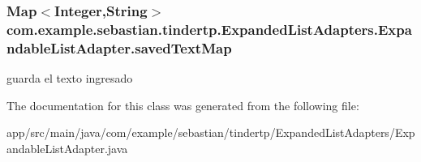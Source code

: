 \subsubsection[{\texorpdfstring{saved\+Text\+Map}{savedTextMap}}]{\setlength{\rightskip}{0pt plus 5cm}Map$<$Integer,String$>$ com.\+example.\+sebastian.\+tindertp.\+Expanded\+List\+Adapters.\+Expandable\+List\+Adapter.\+saved\+Text\+Map\hspace{0.3cm}{\ttfamily [private]}}\hypertarget{classcom_1_1example_1_1sebastian_1_1tindertp_1_1ExpandedListAdapters_1_1ExpandableListAdapter_a77dfc0cc5b6b6200eb43064adf7da1da}{}\label{classcom_1_1example_1_1sebastian_1_1tindertp_1_1ExpandedListAdapters_1_1ExpandableListAdapter_a77dfc0cc5b6b6200eb43064adf7da1da}
guarda el texto ingresado 

The documentation for this class was generated from the following file\+:\begin{DoxyCompactItemize}
\item 
app/src/main/java/com/example/sebastian/tindertp/\+Expanded\+List\+Adapters/Expandable\+List\+Adapter.\+java\end{DoxyCompactItemize}
